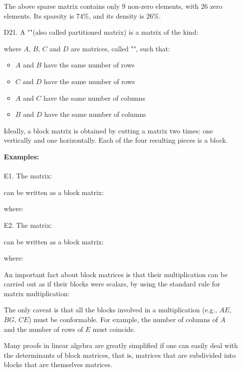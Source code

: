 \begin{enumerate}
		The above sparse matrix contains only $9$ non-zero elements, with $26$ zero elements. Its sparsity is $74\%$, and its density is $26\%$.
		
		\item[D21.] A ""(also called partitioned matrix) is a matrix of the kind:
		
		where $A$, $B$, $C$ and $D$ are matrices, called "", such that:
		\begin{itemize}
			\item $A$ and $B$ have the same number of rows
		
			\item $C$ and $D$ have the same number of rows
		
			\item $A$ and $C$ have the same number of columns
		
			\item $B$ and $D$ have the same number of columns
		\end{itemize}
		Ideally, a block matrix is obtained by cutting a matrix two times: one vertically and one horizontally. Each of the four resulting pieces is a block.
		
		\begin{tcolorbox}[colframe=black,colback=white,sharp corners]
		\textbf{{\Large {}}Examples:}\\\\
		E1. The matrix:
		
		can be written as a block matrix:
		
		where:
		
		E2. The matrix:
		
		can be written as a block matrix:
		
		where:
		
		\end{tcolorbox}
		An important fact about block matrices is that their multiplication can be carried out as if their blocks were scalars, by using the standard rule for matrix multiplication:
		
		The only caveat is that all the blocks involved in a multiplication (e.g., $AE$, $BG$, $CE$) must be conformable. For example, the number of columns of $A$ and the number of rows of $E$ must coincide.
		
		Many proofs in linear algebra are greatly simplified if one can easily deal with the determinants of block matrices, that is, matrices that are subdivided into blocks that are themselves matrices.
	\end{enumerate}
	
